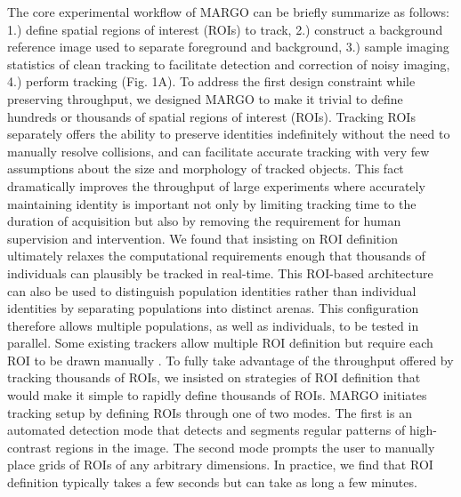 \documentclass[10pt]{article}
\begin{document}
\begin{multicols}{2}
The core experimental workflow of MARGO can be briefly summarize as follows: 1.) define spatial regions of interest (ROIs) to track, 2.) construct a background reference image used to separate foreground and background, 3.) sample imaging statistics of clean tracking to facilitate detection and correction of noisy imaging, 4.) perform tracking (Fig. 1A). To address the first design constraint while preserving throughput, we designed MARGO to make it trivial to define hundreds or thousands of spatial regions of interest (ROIs). Tracking ROIs separately offers the ability to preserve identities indefinitely without the need to manually resolve collisions, and can facilitate accurate tracking with very few assumptions about the size and morphology of tracked objects. This fact dramatically improves the throughput of large experiments where accurately maintaining identity is important not only by limiting tracking time to the duration of acquisition but also by removing the requirement for human supervision and intervention. We found that insisting on ROI definition ultimately relaxes the computational requirements enough that thousands of individuals can plausibly be tracked in real-time. This ROI-based architecture can also be used to distinguish population identities rather than individual identities by separating populations into distinct arenas. This configuration therefore allows multiple populations, as well as individuals, to be tested in parallel. Some existing trackers allow multiple ROI definition but require each ROI to be drawn manually \cite{Prez-Escudero_idTracker_2014,Mnck_BioTracker_2018}. To fully take advantage of the throughput offered by tracking thousands of ROIs, we insisted on strategies of ROI definition that would make it simple to rapidly define thousands of ROIs. MARGO initiates tracking setup by defining ROIs through one of two modes. The first is an automated detection mode that detects and segments regular patterns of high-contrast regions in the image. The second mode prompts the user to manually place grids of ROIs of any arbitrary dimensions. In practice, we find that ROI definition typically takes a few seconds but can take as long a few minutes.


\end{multicols}
\end{document}
